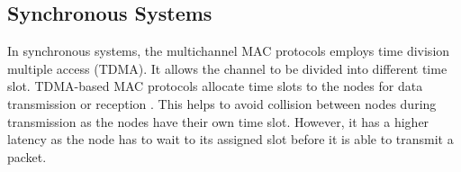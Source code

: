 





\subsection{Synchronous Systems}
In synchronous systems, the multichannel MAC protocols employs time division multiple access (TDMA). It allows the channel to be divided into different time slot. TDMA-based MAC protocols allocate time slots to the nodes for data transmission or reception \cite{y-mac}. This helps to avoid collision between nodes during transmission as the nodes have their own time slot. However, it has a higher latency as the node has to wait to its assigned slot before it is able to transmit a packet. 

